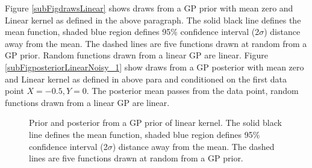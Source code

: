 Figure \ref{subFigdrawsLinear} shows draws from a GP prior with mean zero and Linear kernel as defined in the above paragraph. The solid black line defines the mean function, shaded blue region defines 95\% confidence interval (2$\sigma$) distance away from the mean. The dashed lines are five functions drawn at random from a GP prior. Random functions drawn from a linear GP are linear. Figure \ref{subFigposteriorLinearNoisy_1} show draws from a GP posterior with mean zero and Linear kernel  as defined in above para and conditioned on the first data point $X = -0.5, Y = 0$. The posterior mean passes from the data point, random functions drawn from a linear GP are linear.


\begin{figure}[!ht]
  \centering
    \quad
{}\quad

       \caption{Prior and posterior from a GP prior of linear kernel. The solid black line defines the mean function, shaded blue region defines 95\% confidence interval (2$\sigma$) distance away from the mean. The dashed lines are five functions drawn at random from a GP prior.}
       \label{figPriorAndPosteriorLinearKernel}
\end{figure}

